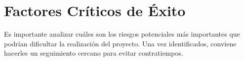\section{Factores Críticos de Éxito}
    Es importante analizar cuáles son los riesgos potenciales más importantes
    que podrían dificultar la realización del proyecto. Una vez identificados,
    conviene hacerles un seguimiento cercano para evitar contratiempos.
